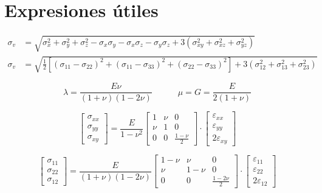 \documentclass[11pt, a4paper,titlepage]{article}
\begin{document}
\section*{Expresiones útiles}

\begin{align}
\sigma_{v}&=\sqrt{\sigma_{x}^2+\sigma_{y}^2+\sigma_{z}^2 - \sigma_x \sigma_y-\sigma_x\sigma_z -\sigma_y \sigma_z +3(\sigma_{xy}^2+\sigma_{xz}^2 +\sigma_{yz}^2)} \\
\sigma_{v}&=\sqrt{\tfrac{1}{2}\left[  (\sigma_{11}-\sigma_{22})^2+(\sigma_{11}-\sigma_{33})^2+(\sigma_{22}-\sigma_{33})^2\right] +3(\sigma_{12}^2+\sigma_{13}^2 +\sigma_{23}^2)}
\end{align}

\begin{equation}
\lambda = \frac{E \nu}{(1+\nu)(1-2\nu)} \qquad\quad \mu=G=\frac{E}{2(1+\nu)}
\end{equation}

\begin{equation}
\begin{bmatrix}
\sigma_{xx} \\
\sigma_{yy} \\
\sigma_{xy}
\end{bmatrix}
={\frac{E}{1-\nu^2}} 
\begin{bmatrix}
1 & \nu & 0 \\
\nu & 1 &0 \\
0 & 0 & \frac{1-\nu}{2}
\end{bmatrix}
\cdot
\begin{bmatrix}
\varepsilon_{xx} \\
\varepsilon_{yy} \\
2\varepsilon_{xy}
\end{bmatrix}
\end{equation}

\begin{equation}
\begin{bmatrix}
\sigma_{11} \\
\sigma_{22} \\
\sigma_{12}
\end{bmatrix}
={\frac{E}{(1+\nu)(1-2\nu)}} 
\begin{bmatrix}
1-\nu & \nu &0 \\
\nu &1-\nu& 0 \\
0 & 0 & \frac{1-2\nu}{2}
\end{bmatrix}
\cdot
\begin{bmatrix}
\varepsilon_{11} \\
\varepsilon_{22} \\
2\varepsilon_{12}
\end{bmatrix}
\end{equation}
\end{document}
